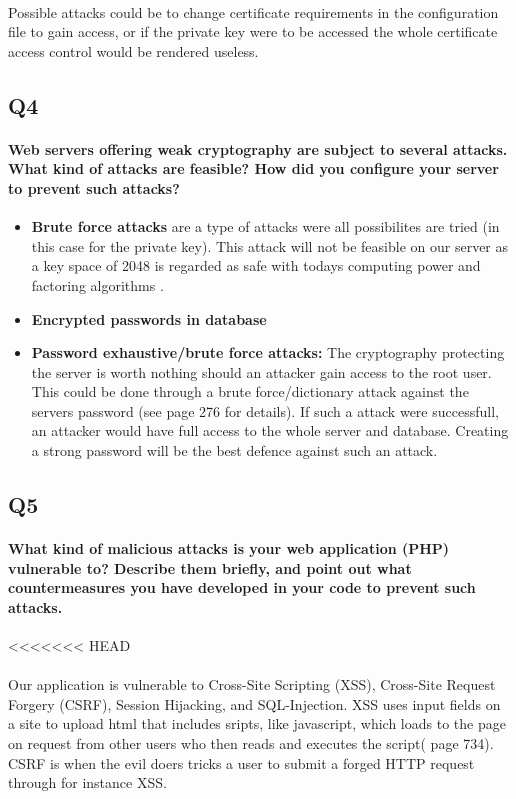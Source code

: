 \documentclass[a4paper,11pt]{article}
\begin{document}
\paragraph{}Possible attacks could be to change certificate requirements in the configuration file to gain access, or if the private key were to be accessed the whole certificate access control would be rendered useless.
\subsection{Q4}
\paragraph{Web servers offering weak cryptography are subject to several attacks. What kind of attacks are feasible? How did you conﬁgure your server to prevent such attacks?}
\begin{itemize}
	\item \textbf{Brute force attacks} are a type of attacks were all possibilites are tried (in this case for the private key). This attack will not be feasible on our server as a key space of 2048 is regarded as safe with todays computing power and factoring algorithms \cite{5}.
	\item \textbf{Encrypted passwords in database} 
	\item \textbf{Password exhaustive/brute force attacks:} The cryptography protecting the server is worth nothing should an attacker gain access to the root user. This could be done through a brute force/dictionary attack against the servers password (see \cite{6} page  276 for details). If such a attack were successfull, an attacker would have full access to the whole server and database. Creating a strong password will be the best defence against such an attack.
\end{itemize}
\subsection{Q5}
\paragraph{What kind of malicious attacks is your web application (PHP) vulnerable to? Describe
them brieﬂy, and point out what countermeasures you have developed in your code to prevent
such attacks.}
<<<<<<< HEAD
\paragraph{}Our application is vulnerable to Cross-Site Scripting (XSS), Cross-Site Request Forgery (CSRF), Session Hijacking, and SQL-Injection. XSS uses input fields on a site to upload html that includes sripts, like javascript, which loads to the page on request from other users who then reads and executes the script(\cite{8} page 734). CSRF is when the evil doers tricks a user to submit a forged HTTP request through for instance XSS.
\end{document}
